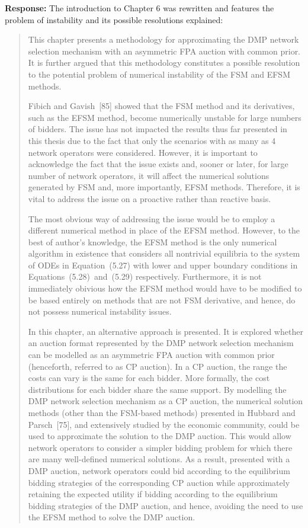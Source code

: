 \documentclass[10pt,a4paper,notitlepage]{article}
\numberwithin{equation}{section}
\begin{document}
\textbf{Response:}
The introduction to Chapter 6 was rewritten and features the problem of instability and its possible resolutions explained:
\begin{quote}
This chapter presents a methodology for approximating the DMP network selection mechanism with an asymmetric FPA auction with common prior. It is further argued that this methodology constitutes a possible resolution to the potential problem of numerical instability of the FSM and EFSM methods.

Fibich and Gavish~[85] showed that the FSM method and its derivatives, such as the EFSM method, become numerically unstable for large numbers of bidders. The issue has not impacted the results thus far presented in this thesis due to the fact that only the scenarios with as many as 4 network operators were considered. However, it is important to acknowledge the fact that the issue exists and, sooner or later, for large number of network operators, it will affect the numerical solutions generated by FSM and, more importantly, EFSM methods. Therefore, it is vital to address the issue on a proactive rather than reactive basis.

The most obvious way of addressing the issue would be to employ a different numerical method in place of the EFSM method. However, to the best of author's knowledge, the EFSM method is the only numerical algorithm in existence that considers all nontrivial equilibria to the system of ODEs in Equation~(5.27) with lower and upper boundary conditions in Equations~(5.28)~and~(5.29) respectively. Furthermore, it is not immediately obivious how the EFSM method would have to be modified to be based entirely on methods that are not FSM derivative, and hence, do not possess numerical instability issues.

In this chapter, an alternative approach is presented. It is explored whether an auction format represented by the DMP network selection mechanism can be modelled as an asymmetric FPA auction with common prior (henceforth, referred to as CP auction). In a CP auction, the range the costs can vary is the same for each bidder. More formally, the cost distributions for each bidder share the same support. By modelling the DMP network selection mechanism as a CP auction, the numerical solution methods (other than the FSM-based methods) presented in Hubbard and Parsch~[75], and extensively studied by the economic community, could be used to approximate the solution to the DMP auction. This would allow network operators to consider a simpler bidding problem for which there are many well-defined numerical solutions. As a result, presented with a DMP auction, network operators could bid according to the equilibrium bidding strategies of the corresponding CP auction while approximately retaining the expected utility if bidding according to the equilibrium bidding strategies of the DMP auction, and hence, avoiding the need to use the EFSM method to solve the DMP auction.
\end{quote}
\end{document}
